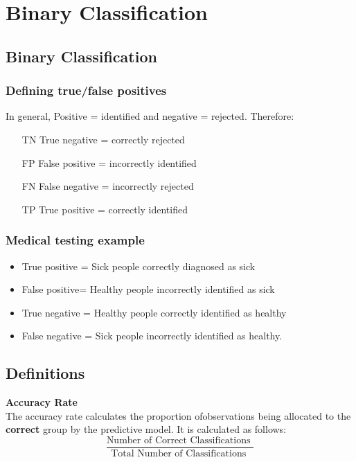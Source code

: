 \documentclass[12pt]{article}
\begin{document}
	
	
	\section*{Binary Classification}
	
	\subsection*{Binary Classification}
	\subsubsection*{Defining true/false positives}
	In general, Positive = identified and negative = rejected. Therefore:
	
	\begin{itemize}
		\item[TN] True negative = correctly rejected
		\item[FP] False positive = incorrectly identified
		\item[FN] False negative = incorrectly rejected
		\item[TP] True positive = correctly identified
	\end{itemize}
	\subsubsection*{Medical testing example}
	\begin{itemize}
		\item True positive = Sick people correctly diagnosed as sick
		
		\item False positive= Healthy people incorrectly identified as sick
		
		\item True negative = Healthy people correctly identified as healthy
		
		\item False negative = Sick people incorrectly identified as healthy.
	\end{itemize}
	\newpage
	\subsection*{Definitions}
	\textbf{Accuracy Rate}\\
	The accuracy rate calculates the proportion ofobservations being allocated to the \textbf{correct} group by the predictive model. It is calculated as follows:
	\[ \frac{
		\mbox{Number of Correct Classifications }}{\mbox{Total Number of Classifications }} \]
	
\end{document}
